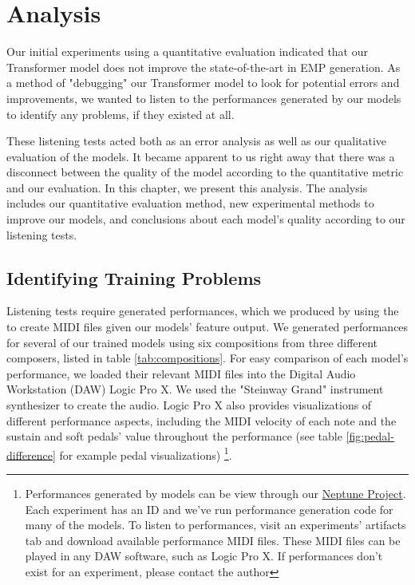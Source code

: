 \chapter{Analysis} \label{ch:ch6}
Our initial experiments using a quantitative evaluation indicated that our Transformer model does not improve the state-of-the-art in EMP generation. As a method of "debugging" our Transformer model to look for potential errors and improvements, we wanted to listen to the performances generated by our models to identify any problems, if they existed at all. 

These listening tests acted both as an error analysis as well as our qualitative evaluation of the models. It became apparent to us right away that there was a disconnect between the quality of the model according to the quantitative metric and our evaluation. In this chapter, we present this analysis. The analysis includes our quantitative evaluation method, new experimental methods to improve our models, and conclusions about each model's quality according to our listening tests. 



\section{Identifying Training Problems}\label{sec:qualitative-eval-problems}
Listening tests require generated performances, which we produced by using the \vnetf{} to create MIDI files given our models' feature output. We generated performances for several of our trained models using six compositions from three different composers, listed in table \ref{tab:compositions}. For easy comparison of each model's performance, we loaded their relevant MIDI files into the Digital Audio Workstation (DAW) Logic Pro X. We used the "Steinway Grand" instrument synthesizer to create the audio. Logic Pro X also provides visualizations of different performance aspects, including the MIDI velocity of each note and the sustain and soft pedals' value throughout the performance (see table \ref{fig:pedal-difference} for example pedal visualizations)%
\footnote{Performances generated by models can be view through our \href{https://ui.neptune.ai/richt3211/thesis/experiments}{Neptune Project}. Each experiment has an ID and we've run performance generation code for many of the models. To listen to performances, visit an experiments' artifacts tab and download available performance MIDI files. These MIDI files can be played in any DAW software, such as Logic Pro X. If performances don't exist for an experiment, please contact the author}. 

